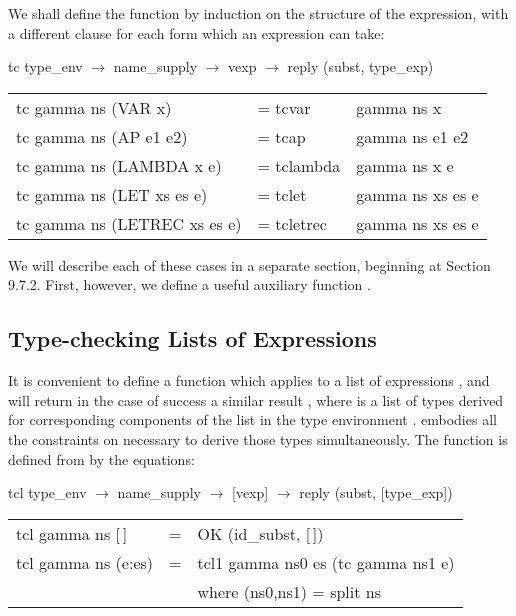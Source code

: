 We shall define the function  by induction on the structure of the
expression, with a different clause for each form which an expression can
take:
\begin{mlcoded}
    \phantom{n}tc \hastype{} type\_env $\rightarrow$ name\_supply $\rightarrow$ vexp $\rightarrow$ reply (subst, type\_exp) \\
    \begin{tabular}{l l l}
        tc gamma ns (VAR x)        & = tcvar    &gamma ns x \\
        tc gamma ns (AP e1 e2)     & = tcap     &gamma ns e1 e2 \\
        tc gamma ns (LAMBDA x e)   & = tclambda &gamma ns x e \\
        tc gamma ns (LET xs es e)  & = tclet    &gamma ns xs es e \\
        tc gamma ns (LETREC xs es e) & = tcletrec &gamma ns xs es e
    \end{tabular}
\end{mlcoded}
We will describe each of these cases in a separate section, beginning at Section
9.7.2. First, however, we define a useful auxiliary function .

\subsection{Type-checking Lists of Expressions}

It is convenient to define a function  which applies to a list of
expressions , and will return in the case of success a similar result ,
where  is a list of types derived for corresponding components of the list  in
the type environment .  embodies all the constraints
on  necessary to derive those types simultaneously. The function is
defined from  by the equations:
\begin{mlcoded}
    \phantom{n}tcl \hastype{} type\_env $\rightarrow$ name\_supply $\rightarrow$ [vexp] $\rightarrow$ reply (subst, [type\_exp]) \\
    \begin{tabular}{lll}
        tcl gamma ns [\,]  &= &OK (id\_subst, [\,]) \\
        tcl gamma ns (e:es) &= &tcl1 gamma ns0 es (tc gamma ns1 e) \\
        & &where (ns0,ns1) = split ns
    \end{tabular}
\end{mlcoded}

